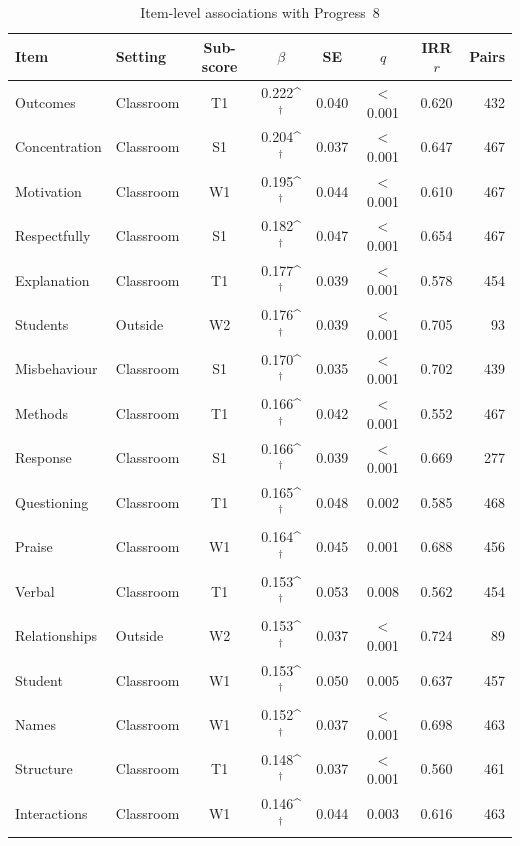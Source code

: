 \begin{table}[htbp]\centering
\caption{Item-level associations with Progress~8}
\label{tab:items_fdr}
\def\sym#1{\ifmmode^{#1}\else\(^{#1}\)\fi}
\footnotesize
\begin{tabular}{llcccccr}
\toprule
Item & Setting & Sub-score & $\beta$ & SE & $q$ & IRR $r$ & Pairs \\
\midrule
Outcomes        & Classroom & T1  & 0.222\sym{\dagger} & 0.040 & $<$0.001 & 0.620 & 432 \\
Concentration   & Classroom & S1  & 0.204\sym{\dagger} & 0.037 & $<$0.001 & 0.647 & 467 \\
Motivation      & Classroom & W1  & 0.195\sym{\dagger} & 0.044 & $<$0.001 & 0.610 & 467 \\
Respectfully    & Classroom & S1  & 0.182\sym{\dagger} & 0.047 & $<$0.001 & 0.654 & 467 \\
Explanation     & Classroom & T1  & 0.177\sym{\dagger} & 0.039 & $<$0.001 & 0.578 & 454 \\
Students        & Outside   & W2  & 0.176\sym{\dagger} & 0.039 & $<$0.001 & 0.705 & 93  \\
Misbehaviour    & Classroom & S1  & 0.170\sym{\dagger} & 0.035 & $<$0.001 & 0.702 & 439 \\
Methods         & Classroom & T1  & 0.166\sym{\dagger} & 0.042 & $<$0.001 & 0.552 & 467 \\
Response        & Classroom & S1  & 0.166\sym{\dagger} & 0.039 & $<$0.001 & 0.669 & 277 \\
Questioning     & Classroom & T1  & 0.165\sym{\dagger} & 0.048 & 0.002    & 0.585 & 468 \\
Praise          & Classroom & W1  & 0.164\sym{\dagger} & 0.045 & 0.001    & 0.688 & 456 \\
Verbal          & Classroom & T1  & 0.153\sym{\dagger} & 0.053 & 0.008    & 0.562 & 454 \\
Relationships   & Outside   & W2  & 0.153\sym{\dagger} & 0.037 & $<$0.001 & 0.724 & 89  \\
Student         & Classroom & W1  & 0.153\sym{\dagger} & 0.050 & 0.005    & 0.637 & 457 \\
Names           & Classroom & W1  & 0.152\sym{\dagger} & 0.037 & $<$0.001 & 0.698 & 463 \\
Structure       & Classroom & T1  & 0.148\sym{\dagger} & 0.037 & $<$0.001 & 0.560 & 461 \\
Interactions    & Classroom & W1  & 0.146\sym{\dagger} & 0.044 & 0.003    & 0.616 & 463 \\

\end{tabular}
\end{table}
